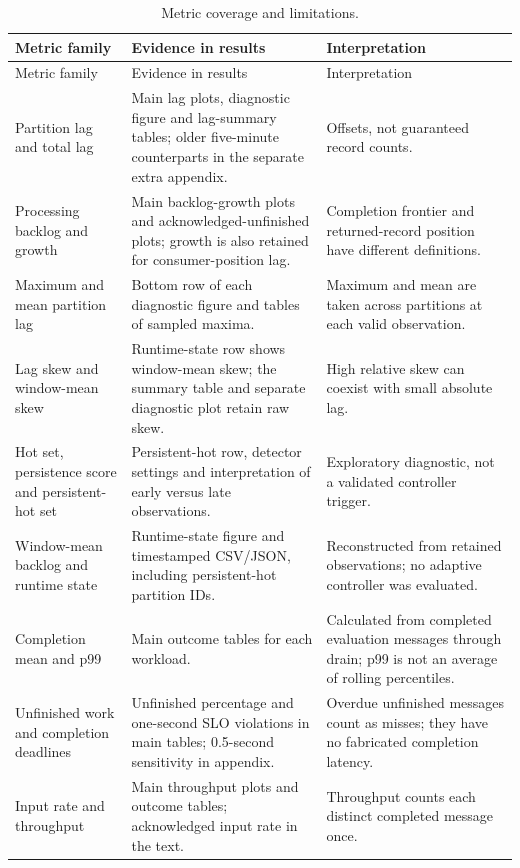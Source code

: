 \documentclass[10pt]{article}
\begin{document}
\begin{longtable}{@{}>{\raggedright\arraybackslash}p{.22\linewidth}>{\raggedright\arraybackslash}p{.42\linewidth}>{\raggedright\arraybackslash}p{.29\linewidth}@{}}
\caption{Metric coverage and limitations.}
\label{tab:result-metric-coverage}\\
\toprule
Metric family & Evidence in results & Interpretation\\
\midrule\endfirsthead
\toprule
Metric family & Evidence in results & Interpretation\\\midrule\endhead
Partition lag and total lag & Main lag plots, diagnostic figure and lag-summary tables; older five-minute counterparts in the separate extra appendix. & Offsets, not guaranteed record counts.\\
Processing backlog and growth & Main backlog-growth plots and acknowledged-unfinished plots; growth is also retained for consumer-position lag. & Completion frontier and returned-record position have different definitions.\\
Maximum and mean partition lag & Bottom row of each diagnostic figure and tables of sampled maxima. & Maximum and mean are taken across partitions at each valid observation.\\
Lag skew and window-mean skew & Runtime-state row shows window-mean skew; the summary table and separate diagnostic plot retain raw skew. & High relative skew can coexist with small absolute lag.\\
Hot set, persistence score and persistent-hot set & Persistent-hot row, detector settings and interpretation of early versus late observations. & Exploratory diagnostic, not a validated controller trigger.\\
Window-mean backlog and runtime state & Runtime-state figure and timestamped CSV/JSON, including persistent-hot partition IDs. & Reconstructed from retained observations; no adaptive controller was evaluated.\\
Completion mean and p99 & Main outcome tables for each workload. & Calculated from completed evaluation messages through drain; p99 is not an average of rolling percentiles.\\
Unfinished work and completion deadlines & Unfinished percentage and one-second SLO violations in main tables; 0.5-second sensitivity in appendix. & Overdue unfinished messages count as misses; they have no fabricated completion latency.\\
Input rate and throughput & Main throughput plots and outcome tables; acknowledged input rate in the text. & Throughput counts each distinct completed message once.\\

\end{longtable}
\end{document}
